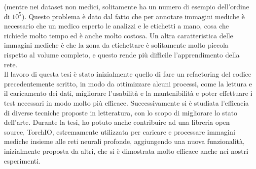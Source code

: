\documentclass[11pt, oneside]{Thesis} %
\begin{document}
{(mentre nei dataset non medici, solitamente ha un numero di esempio dell'ordine
di $10^5$). Questo problema è dato dal fatto che per annotare immagini mediche
è necessario che un medico esperto le analizzi e le etichetti a mano, cosa che
richiede molto tempo ed è anche molto costosa.
Un altra caratteristica delle immagini mediche è che la zona da etichettare è
solitamente molto piccola rispetto al volume completo, e questo rende più
difficile l'apprendimento della rete.\\
Il lavoro di questa tesi è stato inizialmente quello di fare un refactoring del
codice precedentemente scritto, in modo da ottimizzare alcuni processi, come la
lettura e il caricamento dei dati, migliorare l'usabilità e la mantenibilità e
poter effettuare i test necessari in modo molto più efficace.
Successivamente si è studiata l'efficacia di diverse tecniche proposte in
letteratura, con lo scopo di migliorare lo stato dell'arte. Durante la tesi, ho
potuto anche contribuire ad una libreria open source, TorchIO, estremamente
utilizzata per caricare e processare immagini mediche insieme alle reti neurali
profonde, aggiungendo una nuova funzionalità, inizialmente proposta da altri,
che si è dimostrata molto efficace anche nei nostri esperimenti.


}
%
\clearpage %

\mainmatter
{} %

\pagestyle{empty} %





\clearpage %
\end{document}
